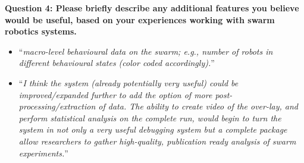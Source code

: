 
\clearpage
\noindent\textbf{Question 4: Please briefly describe any additional features you believe would be useful, based on your experiences working with swarm robotics systems.}

\begin{itemize}
\item ``\textit{macro-level behavioural data on the swarm; e.g., number of robots in different behavioural states (color coded accordingly).}''
\item ``\textit{I think the system (already potentially very useful) could be improved/expanded further to add the option of more post-processing/extraction of data. The ability to create video of the over-lay, and perform statistical analysis on the complete run, would begin to turn the system in not only a very useful debugging system but a complete package allow researchers to gather high-quality, publication ready analysis of swarm experiments.}''
\end{itemize}

